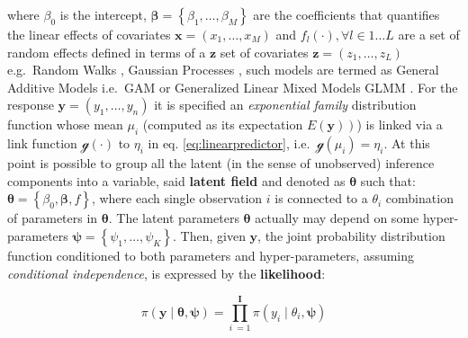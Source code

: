 \documentclass[
  12pt,
  a4paper,
  oneside]{book}
\theoremstyle{definition}
\theoremstyle{definition}
\theoremstyle{definition}
\theoremstyle{remark}
\begin{document}
where \(\beta_{0}\) is the intercept, \(\boldsymbol{\beta}=\left\{\beta_{1}, \ldots, \beta_{M}\right\}\) are the coefficients that quantifies the linear effects of covariates \(\boldsymbol{x}=\left({x}_{1}, \ldots, {x}_{M}\right)\) and \(f_{l}(\cdot), \forall l \in 1 \ldots L\) are a set of random effects defined in terms of a \(\boldsymbol{z}\) set of covariates \(\boldsymbol{z}=\left(z_{1}, \ldots, z_{L}\right)\) e.g.~Random Walks \citep{GMRFRue}, Gaussian Processes \citep{besag1995conditional}, such models are termed as General Additive Models i.e.~GAM or Generalized Linear Mixed Models GLMM \citep{wang2018bayesian}.
For the response \(\mathbf{y}=\left(y_{1}, \ldots, y_{n}\right)\) it is specified an \emph{exponential family} distribution function whose mean \(\mu_i\) (computed as its expectation \(\left.E\left(\mathbf{y}\right)\right)\)) is linked via a link function \(\mathscr{g}(\cdot)\) to \(\eta_{i}\) in eq. \eqref{eq:linearpredictor}, i.e.~\(\mathscr{g}\left(\mu_i\right)=\eta_{i}\). At this point is possible to group all the latent (in the sense of unobserved) inference components into a variable, said \textbf{latent field} and denoted as \(\boldsymbol{\theta}\) such that: \(\boldsymbol{\theta}=\left\{\beta_{0}, \boldsymbol{\beta}, f\right\}\), where each single observation \(i\) is connected to a \(\theta_{i}\) combination of parameters in \(\boldsymbol{\theta}\).
The latent parameters \(\boldsymbol{\theta}\) actually may depend on some hyper-parameters \(\boldsymbol{\psi} = \left\{\psi_{1}, \ldots, \psi_{K}\right\}\). Then, given \(\mathbf{y}\), the joint probability distribution function conditioned to both parameters and hyper-parameters, assuming \emph{conditional independence}, is expressed by the \textbf{likelihood}:

\begin{equation}
  \pi(\boldsymbol{\mathbf{y}} \mid \boldsymbol{\theta}, \boldsymbol{\psi})=\prod_{i\ = 1}^{\mathbf{I}} \pi\left(y_{i} \mid \theta_{i}, \boldsymbol{\psi}\right)
\label{eq:jpd}
\end{equation}
\end{document}
